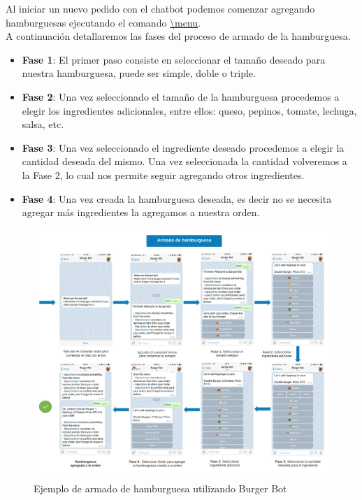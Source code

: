 \documentclass[a4paper,12pt]{article}
\begin{document}
Al iniciar un nuevo pedido con el chatbot podemos comenzar agregando hamburguesas ejecutando el comando
\color{blue}\uline{\textbackslash menu}\color{black}. 
\\
A continuación detallaremos las fases del proceso de armado de la hamburguesa.

\begin{itemize}
	
	\item \textbf{Fase 1}: El primer paso consiste en seleccionar el tamaño deseado para nuestra hamburguesa, puede ser simple, doble o triple.
	
	\item \textbf{Fase 2}: Una vez seleccionado el tamaño de la hamburguesa procedemos a elegir los ingredientes adicionales, entre ellos: queso, pepinos, tomate, lechuga, salsa, etc. 
	
	\item \textbf{Fase 3}: Una vez seleccionado el ingrediente deseado procedemos a elegir la cantidad deseada del mismo. Una vez seleccionada la cantidad volveremos a la Fase 2, lo cual nos permite seguir agregando otros ingredientes.
	
	\item \textbf{Fase 4}: Una vez creada la hamburguesa deseada, es decir no se necesita agregar más ingredientes la agregamos a nuestra orden.	
	
\end{itemize}

\begin{figure}[H]
	\centering
	\includegraphics[width=1.0\linewidth]{diagrama-flujo-chat-bot.jpeg}
	\caption{Ejemplo de armado de hamburguesa utilizando Burger Bot}
	\label{fig:Armado hamburguesa chat bot}
\end{figure}
\end{document}
